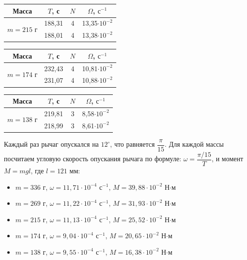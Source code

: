 \documentclass[a4paper,12pt]{article}
\begin{document}
	\begin{center}
		\begin{tabular}{|c|c|c|c|}
			\hline
			Масса & $T$, с& $N$ &$\Omega$, $\text{с}^{-1}$ \\
			\hline
			\multirow{2}{*}{$m = 215$ г}&188,31&4& 13,35$\cdot 10^{-2}$ \\
			\cline{2-4}
			&188,01 & 4 &13,38$\cdot 10^{-2}$  \\
			\hline
		\end{tabular}
		\quad
		\begin{tabular}{|c|c|c|c|}
			\hline
			Масса & $T$, с& $N$ &$\Omega$, $\text{с}^{-1}$ \\
			\hline
			\multirow{2}{*}{$m = 174$ г}&232,43&4&10,81$\cdot 10^{-2}$ \\
			\cline{2-4}
			&231,07 & 4 &10,88$\cdot 10^{-2}$  \\
			\hline
		\end{tabular}
	\end{center}

	\begin{center}
		\begin{tabular}{|c|c|c|c|}
			\hline
			Масса & $T$, с& $N$ &$\Omega$, $\text{с}^{-1}$ \\
			\hline
			\multirow{2}{*}{$m = 138$ г}&219,81&3&8,58$\cdot 10^{-2}$ \\
			\cline{2-4}
			&218,99 & 3 &8,61$\cdot 10^{-2}$  \\
			\hline
		\end{tabular}
	\end{center}

	Каждый раз рычаг опускался на $12^\circ$, что равняется $\dfrac{\pi}{15}$. Для каждой массы посчитаем угловую скорость опускания рычага по формуле: $\omega = \dfrac{\pi/15}{T}$, и момент $M = mgl$, где $l = 121$ мм:
	\begin{itemize}
		\item $m = 336$ г, $\omega = 11,71\cdot 10^{-4}$ $\text{с}^{-1}$, $M = 39,88\cdot10^{-2}$ Н$\cdot$м
		\item $m = 269$ г, $\omega = 11,22\cdot 10^{-4}$ $\text{с}^{-1}$, $M = 31,93\cdot10^{-2}$ Н$\cdot$м
		\item $m = 215$ г, $\omega = 11,13\cdot 10^{-4}$ $\text{с}^{-1}$, $M = 25,52\cdot10^{-2}$ Н$\cdot$м
		\item $m = 174$ г, $\omega = 9,04\cdot 10^{-4}$ $\text{с}^{-1}$, $M = 20,65\cdot10^{-2}$ Н$\cdot$м
		\item $m = 138$ г, $\omega = 9,55\cdot 10^{-4}$ $\text{с}^{-1}$, $M = 16,38\cdot10^{-2}$ Н$\cdot$м
	\end{itemize}
\end{document}
